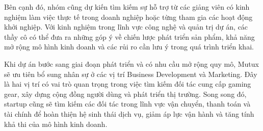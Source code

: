 Bên cạnh đó, nhóm cũng dự kiến tìm kiếm sự hỗ trợ từ các giảng viên có kinh nghiệm làm việc thực tế trong doanh nghiệp hoặc từng tham gia các hoạt động khởi nghiệp. Với kinh nghiệm trong lĩnh vực công nghệ và quản trị dự án, các thầy cô có thể đưa ra những góp ý về chiến lược phát triển sản phẩm, khả năng mở rộng mô hình kinh doanh và các rủi ro cần lưu ý trong quá trình triển khai.

Khi dự án bước sang giai đoạn phát triển và có nhu cầu mở rộng quy mô, Mutux sẽ ưu tiên bổ sung nhân sự ở các vị trí Business Development và Marketing. Đây là hai vị trí có vai trò quan trọng trong việc tìm kiếm đối tác cung cấp gaming gear, xây dựng cộng đồng người dùng và phát triển thị trường. Song song đó, startup cũng sẽ tìm kiếm các đối tác trong lĩnh vực vận chuyển, thanh toán và tài chính để hoàn thiện hệ sinh thái dịch vụ, giảm áp lực vận hành và tăng tính khả thi của mô hình kinh doanh.
